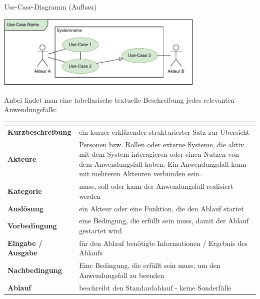\begin{diag}{Use-Case-Diagramm (Aufbau)}
    \begin{center}
        \includegraphics[width=0.75\textwidth]{includes/figures/defi_diagrams_use_case_intro.pdf}
    \end{center}

    Anbei findet man eine tabellarische textuelle Beschreibung jedes relevanten Anwendungsfalls:

    \begin{tabularx}{\textwidth}{|>{\bfseries}l|X|}
        \hline
        \multicolumn{2}{|l|}{Use-Case-Nummer, Use-Case-Name}                                                                                                 \\\hline\hline
        Kurzbeschreibung  & ein kurzer erklärender strukturierter Satz zur Übersicht                                                                         \\\hline
        Akteure           & Personen bzw. Rollen oder externe Systeme, die aktiv mit dem System interagieren oder einen Nutzen von dem Anwendungsfall haben.
        Ein Anwendungsfall kann mit mehreren Akteuren verbunden sein.                                                                                        \\\hline
        Kategorie         & muss, soll oder kann der Anwendungsfall realisiert werden                                                                        \\\hline
        Auslösung         & ein Akteur oder eine Funktion, die den Ablauf startet                                                                            \\\hline
        Vorbedingung      & eine Bedingung, die erfüllt sein muss, damit der Ablauf gestartet wird                                                           \\\hline
        Eingabe / Ausgabe & für den Ablauf benötigte Informationen / Ergebnis des Ablaufs                                                                    \\\hline
        Nachbedingung     & Eine Bedingung, die erfüllt sein muss, um den Anwendungsfall zu beenden                                                          \\\hline
        Ablauf            & beschreibt den Standardablauf - keine Sonderfälle                                                                                \\\hline
    \end{tabularx}
\end{diag}

